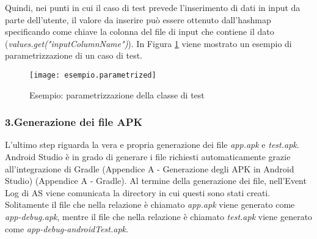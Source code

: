 \bigskip

\noindent Quindi, nei punti in cui il caso di test prevede l'inserimento di dati in input da parte dell'utente, il valore da inserire può essere ottenuto dall'hashmap specificando come chiave la colonna del file di input che contiene il dato  (\emph{values.get("inputColumnName")}). In Figura \ref{fig:esempio.parametrized} viene mostrato un esempio di parametrizzazione di un caso di test.

\begin{figure}[H]
	\texttt{[image: esempio.parametrized]}
	\centering
	\caption{Esempio: parametrizzazione della classe di test}
    \label{fig:esempio.parametrized}
\end{figure}

\subsubsection*{3.Generazione dei file APK}
L'ultimo step riguarda la vera e propria generazione dei file \emph{app.apk} e \emph{test.apk}. Android Studio è in grado di generare i file richiesti automaticamente grazie all'integrazione di Gradle (Appendice A - Generazione degli APK in Android Studio) (Appendice A - Gradle). Al termine della generazione dei file, nell'Event Log di AS viene comunicata la directory in cui questi sono stati creati.  Solitamente il file che nella relazione è chiamato \emph{app.apk} viene generato come \emph{app-debug.apk}, mentre il file che nella relazione è chiamato \emph{test.apk} viene generato come \emph{app-debug-androidTest.apk}.


